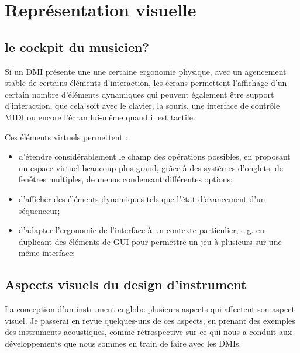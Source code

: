 %
\chapter{Représentation visuelle}
\label{ch:visual_representation}



\section{le cockpit du musicien?}
Si un DMI présente une une certaine ergonomie physique, avec un agencement stable de certains éléments d'interaction, les écrans permettent l'affichage d'un certain nombre d'éléments dynamiques qui peuvent également être support d'interaction, que cela soit avec le clavier, la souris, une interface de contrôle MIDI ou encore l'écran lui-même quand il est tactile.

Ces éléments virtuels permettent :
\vspace{-1em}
\begin{itemize}[noitemsep]
	\item d'étendre considérablement le champ des opérations possibles, en proposant un espace virtuel beaucoup plus grand, grâce à des systèmes d'onglets, de fenêtres multiples, de menus condensant différentes options;
	\item d'afficher des éléments dynamiques tels que l'état d'avancement d'un séquenceur;
	\item d'adapter l'ergonomie de l'interface à un contexte particulier, e.g. en duplicant des éléments de GUI pour permettre un jeu à plusieurs sur une même interface;
\end{itemize}

\section{Aspects visuels du design d'instrument}

La conception d'un instrument englobe plusieurs aspects qui affectent son aspect visuel. Je passerai en revue quelques-uns de ces aspects, en prenant des exemples des instruments acoustiques, comme rétrospective sur ce qui nous a conduit aux développements que nous sommes en train de faire avec les \glspl{DMI}.

